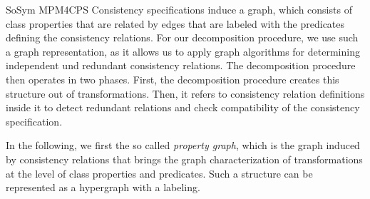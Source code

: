 \begin{copiedFrom}{SoSym MPM4CPS}
Consistency specifications induce a graph, which consists of class properties that are related by edges that are labeled with the predicates defining the consistency relations.
For our decomposition procedure, we use such a graph representation, as it allows us to apply graph algorithms for determining independent und redundant consistency relations.
The decomposition procedure then operates in two phases. First, the decomposition procedure creates this structure out of \qvtr transformations. Then, it refers to consistency relation definitions inside it to detect redundant relations and check compatibility of the consistency specification. 

In the following, we first the so called \emph{property graph}, which is the graph induced by consistency relations that brings the graph characterization of transformations at the level of class properties and predicates. Such a structure can be represented as a hypergraph with a labeling.


\end{copiedFrom}

